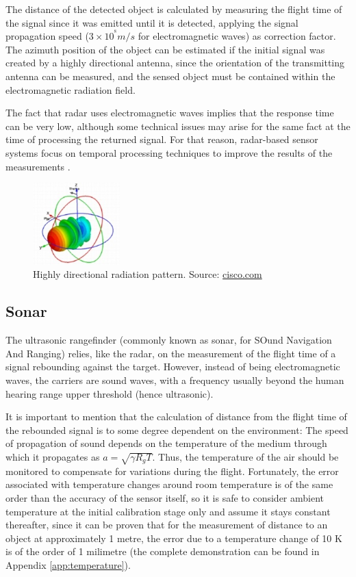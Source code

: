 The distance of the detected object is calculated by measuring the flight time of the signal since it was emitted until it is detected, applying the signal propagation speed ($3 \times 10^{^8} m/s$ for electromagnetic waves) as correction factor.
The azimuth position of the object can be estimated if the initial signal was created by a highly directional antenna, since the orientation of the transmitting antenna can be measured, and the sensed object must be contained within the electromagnetic radiation field.

The fact that radar uses electromagnetic waves implies that the response time can be very low, although some technical issues may arise for the same fact at the time of processing the returned signal.
For that reason, radar-based sensor systems focus on temporal processing techniques to improve the results of the measurements \cite{krolik2005}.

\begin{figure}[htbp]
	\centering
	\includegraphics[width=0.3\textwidth]{./figures/antennaPattern.jpg}
	\caption{Highly directional radiation pattern. {\footnotesize Source: \url{cisco.com}}}
	\label{fig:antenna}
\end{figure}

\subsection{Sonar}

The ultrasonic rangefinder (commonly known as sonar, for SOund Navigation And Ranging) relies, like the radar, on the measurement of the flight time of a signal rebounding against the target.
However, instead of being electromagnetic waves, the carriers are sound waves, with a frequency usually beyond the human hearing range upper threshold (hence ultrasonic).

It is important to mention that the calculation of distance from the flight time of the rebounded signal is to some degree dependent on the environment:
The speed of propagation of sound depends on the temperature of the medium through which it propagates as $a=\sqrt{\gamma R_g T}$.
Thus, the temperature of the air should be monitored to compensate for variations during the flight.
Fortunately, the error associated with temperature changes around room temperature is of the same order than the accuracy of the sensor itself, so it is safe to consider ambient temperature at the initial calibration stage only and assume it stays constant thereafter, since it can be proven that for the measurement of distance to an object at approximately 1 metre, the error due to a temperature change of 10 K is of the order of 1 milimetre (the complete demonstration can be found in Appendix \ref{app:temperature}).

